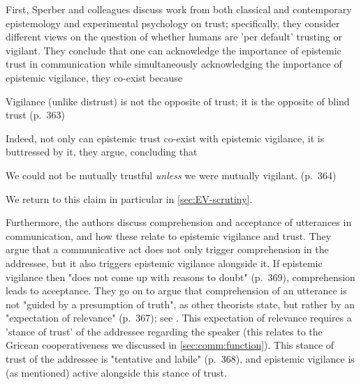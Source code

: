 First, Sperber and colleagues discuss work from both classical and contemporary epistemology and experimental psychology on trust; specifically, they consider different views on the question of whether humans are 'per default' trusting or vigilant. They conclude that one can acknowledge the importance of epistemic trust in communication while simultaneously acknowledging the importance of epistemic vigilance, they co-exist because
\begin{quoting}
    Vigilance (unlike distrust) is not the opposite of trust; it is the opposite
of blind trust
    \hfill (p.~363)
\end{quoting}
Indeed, not only can epistemic trust co-exist with epistemic vigilance, it is buttressed by it, they argue, concluding that
\begin{quoting}
    We could not be mutually trustful \emph{unless} we were mutually vigilant.
    \hfill (p.~364)
\end{quoting}
We return to this claim in particular in \cref{sec:EV-scrutiny}.

Furthermore, the authors discuss comprehension and acceptance of utterances in communication, and how these relate to epistemic vigilance and trust.
They argue that a communicative act does not only trigger comprehension in the addressee, but it also triggers epistemic vigilance alongside it. If epistemic vigilance then "does not come up with reasons to doubt" (p.~369), comprehension leads to acceptance.
They go on to argue that comprehension of an utterance is not "guided by a presumption of truth", as other theorists state, but rather by an "expectation of relevance" (p.~367); see \citet{SperberWilson86}. This expectation of relevance requires a 'stance of trust' of the addressee regarding the speaker (this relates to the Gricean cooperativeness we discussed in \cref{sec:comm:function}).
This stance of trust of the addressee is "tentative and labile" (p.~368), and epistemic vigilance is (as mentioned) active alongside this stance of trust.


